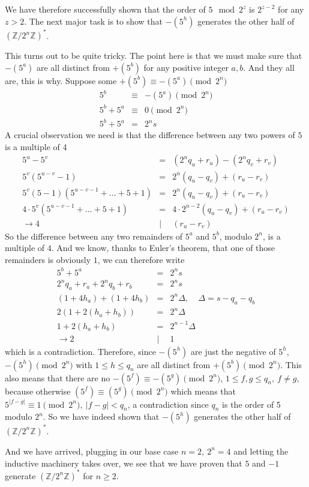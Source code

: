 \documentclass[aps,preprint,preprintnumbers,nofootinbib,showpacs,prd]{revtex4-1}
\newcommand{\nbea}{\begin{eqnarray*}}
\newcommand{\neea}{\end{eqnarray*}}
\begin{document}
We have therefore successfully shown that the order of $5 \mod 2^z$ is $2^{z-2}$ for any $z > 2$. The next major task is to show that $-(5^h)$ generates the other half of $(\mathbb{Z}/2^n\mathbb{Z})^*$.

This turns out to be quite tricky. The point here is that we must make sure that $-(5^a)$ are all distinct from $+(5^b)$ for any positive integer $a,b$. And they all are, this is why. Suppose some $+(5^b) \equiv -(5^a) \pmod{2^n}$
%
\nbea
5^b & \equiv & -(5^a) \pmod{2^n} \\
5^b + 5^a & \equiv & 0 \pmod{2^n} \\
5^b + 5^a & = & 2^n s
\neea
%
A crucial observation we need is that the difference between any two powers of $5$ is a multiple of 4
%
\nbea
5^u - 5^v & = & (2^n q_u + r_u) - (2^n q_v + r_v) \\
5^v(5^{u-v} - 1) & = & 2^n(q_u - q_v) + (r_u - r_v) \\
5^v(5 - 1)(5^{u-v-1} +\dots + 5 + 1) & = & 2^n(q_u - q_v) + (r_u - r_v) \\
4 \cdot 5^v (5^{u-v-1} + \dots + 5 + 1) & = & 4 \cdot 2^{n-2}(q_u - q_v) + (r_u - r_v) \\
\to 4 &|& (r_u - r_v)
\neea
%
So the difference between any two remainders of $5^a$ and $5^b$, modulo $2^n$, is a multiple of $4$. And we know, thanks to Euler's theorem, that one of those remainders is obviously $1$, we can therefore write
%
\nbea
5^b + 5^a & = & 2^n s \\
2^n q_a + r_a + 2^n q_b + r_b & = & 2^n s \\
(1 + 4h_a) + (1 + 4h_b) & = & 2^n \Delta, ~~~~~ \Delta = s - q_a - q_b \\
2(1 + 2(h_a + h_b)) & = & 2^n \Delta \\
1+ 2(h_a + h_b) & = & 2^{n-1} \Delta \\
\to 2 &|& 1
\neea
%
which is a contradiction. Therefore, since $-(5^h)$ are just the negative of $5^h$, $-(5^h) \pmod {2^n}$ with $1\le h \le q_{n}$ are all distinct from $+(5^b) \pmod {2^n}$. This also means that there are no $-(5^f) \equiv -(5^g) \pmod{2^n}$, $1\le f,g \le q_{n}, ~f \neq g$, because otherwise $(5^f) \equiv (5^g) \pmod{2^n}$ which means that $5^{|f-g|} \equiv 1 \pmod{2^n}, ~|f-g| < q_n$, a contradiction since $q_n$ is the order of 5 modulo $2^n$. So we have indeed  shown that $-(5^h)$ generates the other half of $(\mathbb{Z}/2^n\mathbb{Z})^*$.

And we have arrived, plugging in our base case $n=2,~ 2^n=4$ and letting the inductive machinery takes over, we see that we have proven that $5$ and $-1$ generate $(\mathbb{Z}/2^n\mathbb{Z})^*$ for $n\ge2$.
\end{document}
